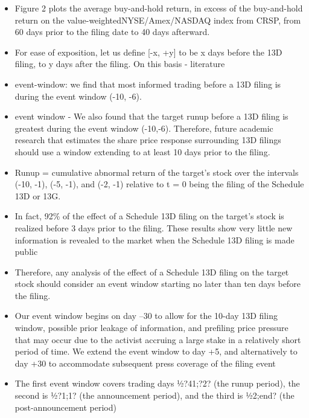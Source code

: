 \documentclass[12pt]{article}
\begin{document}
    \begin{itemize}

        \item Figure 2 plots the average buy-and-hold return, in excess of the buy-and-hold return on the value-weightedNYSE/Amex/NASDAQ index from CRSP, from 60 days prior to the filing date to 40 days afterward.\citep{Collin-Dufresne2015}

        \item For ease of exposition, let us define [-x, +y] to be x days before the 13D filing, to y days after the filing. On this basis - literature \citep{CoffeeJr.2014}

        \item event-window: we find that most informed trading before a 13D filing is during the event window (-10, -6).\citep{Brigida2012}


        \item event window - We also found that the target runup before a 13D filing is greatest during the event window (-10,-6). Therefore, future academic research that estimates the share price response surrounding 13D filings should use a window extending to at least 10 days prior to the filing. \citep{Brigida2012}

        \item Runup = cumulative abnormal return of the target’s stock over the intervals (-10, -1), (-5, -1), and (-2, -1) relative to t = 0 being the filing of the Schedule 13D or 13G. \citep{Brigida2012}
        
        \item In fact, 92\% of the effect of a Schedule 13D filing on the target’s stock is realized before 3 days prior to the filing. These results show very little new information is revealed to the market when the Schedule 13D filing is made public \citep{Brigida2012}

        \item Therefore, any analysis of the effect of a Schedule 13D filing on the target stock should consider an event window starting no later than ten days before the filing. \citep{Brigida2012}

        \item Our event window begins on day –30 to allow for the 10-day 13D filing window, possible prior leakage of information, and prefiling price pressure that may occur due to the activist accruing a large stake in a relatively short period of time. We extend the event window to day +5, and alternatively to day +30 to accommodate subsequent press coverage of the filing event \citep{Klein2009}

        \item The first event window covers trading days ½?41;?2? (the runup period), the second is ½?1;1? (the announcement period), and the third is ½2;end? (the post-announcement period) \citep{Betton2009}
    \end{itemize}
\end{document}
